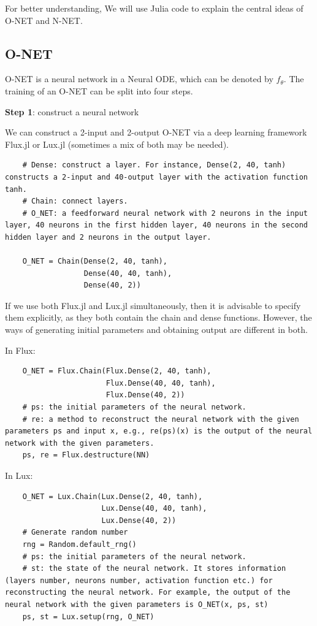 \documentclass[
	parskip, 			   %
	twoside, 			   %
	DIV=14, 			   %
	BCOR=15.0mm, 		   %
	headsepline, 		   %
	open=right, 		   %
	captions=tableheading, %
	bibliography=totoc,    %
	numbers=noenddot       %
]{scrreprt}
\begin{document}
For better understanding, We will use Julia code to explain the central ideas of O-NET and N-NET.

\subsection{O-NET}
O-NET is a neural network in a Neural ODE, which can be denoted by $f_{\theta}$. The training of an O-NET can be split into four steps.

\textbf{Step 1}: construct a neural network

 We can construct a 2-input and 2-output O-NET via a deep learning framework Flux.jl or Lux.jl (sometimes a mix of both may be needed).
\begin{verbatim}
    # Dense: construct a layer. For instance, Dense(2, 40, tanh) constructs a 2-input and 40-output layer with the activation function tanh.
    # Chain: connect layers.
    # O_NET: a feedforward neural network with 2 neurons in the input layer, 40 neurons in the first hidden layer, 40 neurons in the second hidden layer and 2 neurons in the output layer.

    O_NET = Chain(Dense(2, 40, tanh),
                  Dense(40, 40, tanh),
                  Dense(40, 2))
\end{verbatim}

If we use both Flux.jl and Lux.jl simultaneously, then it is advisable to specify them explicitly, as they both contain the chain and dense functions. However, the ways of generating initial parameters and obtaining output are different in both.

In Flux:
\begin{verbatim}
    O_NET = Flux.Chain(Flux.Dense(2, 40, tanh),
                       Flux.Dense(40, 40, tanh),
                       Flux.Dense(40, 2))
    # ps: the initial parameters of the neural network. 
    # re: a method to reconstruct the neural network with the given parameters ps and input x, e.g., re(ps)(x) is the output of the neural network with the given parameters.
    ps, re = Flux.destructure(NN)
\end{verbatim}

In Lux:
\begin{verbatim}
    O_NET = Lux.Chain(Lux.Dense(2, 40, tanh),
                      Lux.Dense(40, 40, tanh),
                      Lux.Dense(40, 2))
    # Generate random number
    rng = Random.default_rng()
    # ps: the initial parameters of the neural network.
    # st: the state of the neural network. It stores information (layers number, neurons number, activation function etc.) for reconstructing the neural network. For example, the output of the neural network with the given parameters is O_NET(x, ps, st)
    ps, st = Lux.setup(rng, O_NET)
\end{verbatim}
\end{document}
